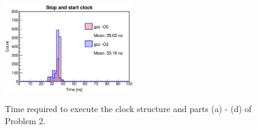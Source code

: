 \documentclass[singlepage,notitlepage,nofootinbib,11pt]{revtex4-1}
\begin{document}
\begin{figure}[h]
  \centering
  \includegraphics[width=0.5\textwidth]{figures/clock.eps}
  \\
\caption{Time required to execute the clock structure and parts (a) - (d) of Problem 2.}
\end{figure} 
\end{document}
